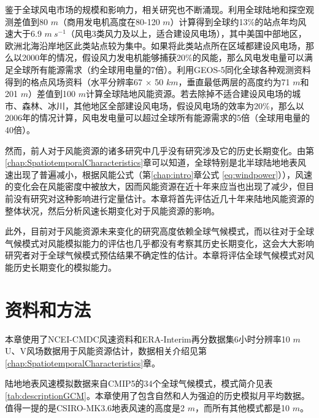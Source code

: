 鉴于全球风电市场的规模和影响力，相关研究也不断涌现。\citet{archer2005evaluation}利用全球陆地和探空观测差值到80 $m$（商用发电机高度在80-120 $m$）计算得到全球约13\%的站点年均风速大于6.9 $m ~ s^{-1}$（风电3类风力及以上，适合建设风电场），其中美国中部地区，欧洲北海沿岸地区此类站点较为集中。如果将此类站点所在区域都建设风电场，那么以2000年的情况，假设风力发电机能够捕获20\%的风能，那么风电发电量可以满足全球所有能源需求（约全球用电量的7倍）。\citet{lu2009global}利用GEOS-5同化全球各种观测资料得到的格点风场资料（水平分辨率67 $\times$ 50 $km$，垂直最低两层的高度约为71 $m$和201 $m$）差值到100 $m$计算全球陆地风能资源。若去除掉不适合建设风电场的城市、森林、冰川，其他地区全部建设风电场，假设风电场的效率为20\%，那么以2006年的情况计算，风电发电量可以超过全球所有能源需求的5倍（全球用电量的40倍）。

然而，前人对于风能资源的诸多研究中几乎没有研究涉及它的历史长期变化。由第\ref{chap:SpatiotemporalCharacteristics}章可以知道，全球特别是北半球陆地地表风速出现了普遍减小，根据风能公式（第\ref{chap:intro}章公式 \ref{eq:windpower}）），风速的变化会在风能密度中被放大，因而风能资源在近十年来应当也出现了减少，但目前没有研究对这种影响进行定量估计。本章将首先评估近几十年来陆地风能资源的整体状况，然后分析风速长期变化对于风能资源的影响。

此外，目前对于风能资源未来变化的研究高度依赖全球气候模式\citep{pryor2011assessing, karnauskas2018southward}，而以往对于全球气候模式对风能模拟能力的评估也几乎都没有考察其历史长期变化，这会大大影响研究者对于全球气候模式预估结果不确定性的估计。本章将评估全球气候模式对风能历史长期变化的模拟能力。

\section{资料和方法}

本章使用了NCEI-CMDC风速资料和ERA-Interim再分数据集6小时分辨率10 $m$ U、V风场数据用于风能资源估计，数据相关介绍见第\ref{chap:SpatiotemporalCharacteristics}章。

陆地地表风速模拟数据来自CMIP5的34个全球气候模式，模式简介见表 \ref{tab:descriptionGCM}。本章使用了包含自然和人为强迫的历史模拟月平均数据。值得一提的是CSIRO-MK3.6地表风速的高度是2 $m$，而所有其他模式都是10 $m$。

